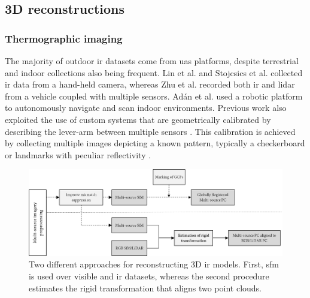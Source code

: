\subsection{3D reconstructions}

\subsubsection{Thermographic imaging}

The majority of outdoor \acrshort{ir} datasets come from \acrshort{uas} platforms, despite terrestrial and indoor collections also being frequent. Lin et al. \cite{lin_fusion_2019} and Stojcsics et al. \cite{stojcsics_high_2018} collected \acrshort{ir} data from a hand-held camera, whereas Zhu et al. \cite{zhu_fusion_2021} recorded both \acrshort{ir} and \acrshort{lidar} from a vehicle coupled with multiple sensors. Adán et al. \cite{adan_towards_2020} used a robotic platform to autonomously navigate and scan indoor environments. Previous work also exploited the use of custom systems that are geometrically calibrated by describing the lever-arm between multiple sensors \cite{javadnejad_photogrammetric_2020, hoegner_fusion_2018}. This calibration is achieved by collecting multiple images depicting a known pattern, typically a checkerboard \cite{javadnejad_photogrammetric_2020} or landmarks with peculiar reflectivity \cite{adan_fusion_2017}. 

\begin{figure}[ht]
	\includegraphics[width=\linewidth]{figs/context/fusion_01.png}
	\caption{Two different approaches for reconstructing 3D \acrshort{ir} models. First, \acrshort{sfm} is used over visible and \acrshort{ir} datasets, whereas the second procedure estimates the rigid transformation that aligns two point clouds. }
    \label{fig:fusion_data_01}
\end{figure}

